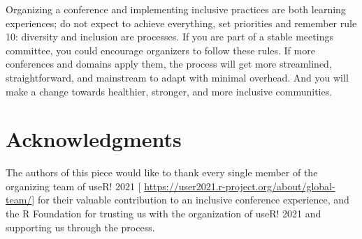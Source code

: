 \documentclass[10pt,letterpaper]{article}
\begin{document}
Organizing a conference and implementing inclusive practices are both learning experiences;
do not expect to achieve everything, set priorities and remember rule 10: diversity and inclusion are processes. 
If you are part of a stable meetings committee, you could encourage organizers to follow these rules. 
If more conferences and domains apply them, the process will get more streamlined, straightforward, and mainstream to adapt with minimal overhead.
And you will make a change towards healthier, stronger, and more inclusive communities.


\section*{Acknowledgments}
The authors of this piece would like to thank every single member of the organizing team of useR! 2021 [ \url{https://user2021.r-project.org/about/global-team/}] for their valuable contribution to an inclusive conference experience, and the R Foundation for trusting us with the organization of useR! 2021 and supporting us through the process. 








\end{document}
